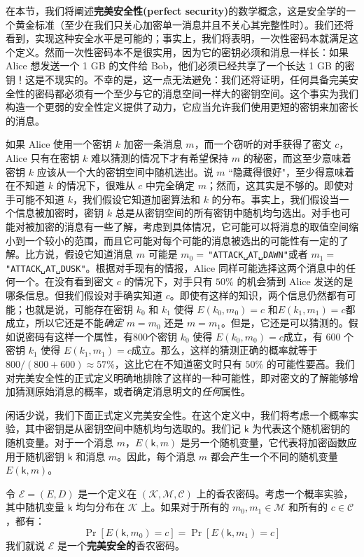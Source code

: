 在本节，我们将阐述\textbf{完美安全性(perfect security)}的数学概念，这是安全学的一个黄金标准（至少在我们只关心加密单一消息并且不关心其完整性时）。我们还将看到，实现这种安全水平是可能的；事实上，我们将表明，一次性密码本就满足这个定义。然而一次性密码本不是很实用，因为它的密钥必须和消息一样长：如果 Alice 想发送一个 1 GB 的文件给 Bob，他们必须已经共享了一个长达 1 GB 的密钥！这是不现实的。不幸的是，这一点无法避免：我们还将证明，任何具备完美安全性的密码都必须有一个至少与它的消息空间一样大的密钥空间。这个事实为我们构造一个更弱的安全性定义提供了动力，它应当允许我们使用更短的密钥来加密长的消息。

如果 Alice 使用一个密钥 $k$ 加密一条消息 $m$，而一个窃听的对手获得了密文 $c$，Alice 只有在密钥 $k$ 难以猜测的情况下才有希望保持 $m$ 的秘密，而这至少意味着密钥 $k$ 应该从一个大的密钥空间中随机选出。说 $m$ ``隐藏得很好"，至少得意味着在不知道 $k$ 的情况下，很难从 $c$ 中完全确定 $m$；然而，这其实是不够的。即使对手可能不知道 $k$，我们假设它知道加密算法和 $k$ 的分布。事实上，我们假设当一个信息被加密时，密钥 $k$ 总是从密钥空间的所有密钥中随机均匀选出。对手也可能对被加密的消息有一些了解，考虑到具体情况，它可能可以将消息的取值空间缩小到一个较小的范围，而且它可能对每个可能的消息被选出的可能性有一定的了解。比方说，假设它知道消息 $m$ 可能是 $m_0=\,$\texttt{"ATTACK␣AT␣DAWN"}或者 $m_1=\,$\texttt{"ATTACK␣AT␣DUSK"}。根据对手现有的情报，Alice 同样可能选择这两个消息中的任何一个。在没有看到密文 $c$ 的情况下，对手只有 $50\%$ 的机会猜到 Alice 发送的是哪条信息。但我们假设对手确实知道 $c$。即使有这样的知识，两个信息仍然都有可能；也就是说，可能存在密钥 $k_0$ 和 $k_1$ 使得 $E(k_0,m_0)=c$ 和$E(k_1,m_1)=c$都成立，所以它还是不能\emph{确定} $m=m_0$ 还是 $m=m_1$。但是，它还是可以猜测的。假如说密码有这样一个属性，有800个密钥 $k_0$ 使得 $E(k_0,m_0)=c$成立，有 600 个密钥 $k_1$ 使得 $E(k_1,m_1)=c$成立。那么，这样的猜测正确的概率就等于 $800/(800+600)\approx57\%$，这比它在不知道密文时只有 $50\%$ 的可能性要高。我们对完美安全性的正式定义明确地排除了这样的一种可能性，即对密文的了解能够增加猜测原始消息的概率，或者确定消息明文的\emph{任何}属性。

闲话少说，我们下面正式定义完美安全性。在这个定义中，我们将考虑一个概率实验，其中密钥是从密钥空间中随机均匀选取的。我们记 $\mathsf{k}$ 为代表这个随机密钥的随机变量。对于一个消息 $m$，$E(\mathsf{k},m)$ 是另一个随机变量，它代表将加密函数应用于随机密钥 $\mathsf{k}$ 和消息 $m$。因此，每个消息 $m$ 都会产生一个不同的随机变量 $E(\mathsf{k},m)$。

\begin{definition}[完美安全性]
令 $\mathcal{E}=(E,D)$ 是一个定义在 $(\mathcal{K},\mathcal{M},\mathcal{C})$ 上的香农密码。考虑一个概率实验，其中随机变量 $\mathsf{k}$ 均匀分布在 $\mathcal{K}$ 上。如果对于所有的 $m_0,m_1\in\mathcal{M}$ 和所有的 $c\in\mathcal{C}$，都有：
$$
\Pr[E(\mathsf{k},m_0)=c]=\Pr[E(\mathsf{k},m_1)=c]
$$
我们就说 $\mathcal{E}$ 是一个\textbf{完美安全的}香农密码。
\end{definition}

